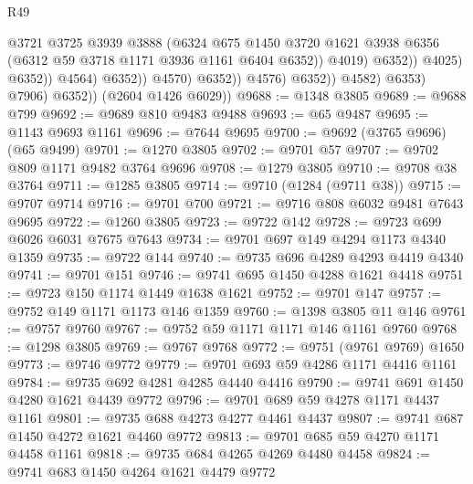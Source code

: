 \begin{lexlean}{R49}
\begin{coremodule}
                                              @3721
                                              @3725
                                              @3939
                                              @3888
                                              (@6324
                                                @675
                                                @1450
                                                @3720
                                                @1621
                                                @3938
                                                @6356
                                                (@6312 @59 @3718 @1171 @3936 @1161 @6404 @6352))
                                              @4019)
                                            @6352))
                                        @4025)
                                      @6352))
                                  @4564)
                                @6352))
                            @4570)
                          @6352))
                      @4576)
                    @6352))
                @4582)
              @6353)
            @7906)
          @6352))
      (@2604 @1426 @6029))
@9688 := @1348 @3805
@9689 := @9688 @799
@9692 := @9689 @810 @9483 @9488
@9693 := @65 @9487
@9695 := @1143 @9693 @1161
@9696 := @7644 @9695
@9700 := @9692 (@3765 @9696) (@65 @9499)
@9701 := @1270 @3805
@9702 := @9701 @57
@9707 := @9702 @809 @1171 @9482 @3764 @9696
@9708 := @1279 @3805
@9710 := @9708 @38 @3764
@9711 := @1285 @3805
@9714 := @9710 (@1284 (@9711 @38))
@9715 := @9707 @9714
@9716 := @9701 @700
@9721 := @9716 @808 @6032 @9481 @7643 @9695
@9722 := @1260 @3805
@9723 := @9722 @142
@9728 := @9723 @699 @6026 @6031 @7675 @7643
@9734 := @9701 @697 @149 @4294 @1173 @4340 @1359
@9735 := @9722 @144
@9740 := @9735 @696 @4289 @4293 @4419 @4340
@9741 := @9701 @151
@9746 := @9741 @695 @1450 @4288 @1621 @4418
@9751 := @9723 @150 @1174 @1449 @1638 @1621
@9752 := @9701 @147
@9757 := @9752 @149 @1171 @1173 @146 @1359
@9760 := @1398 @3805 @11 @146
@9761 := @9757 @9760
@9767 := @9752 @59 @1171 @1171 @146 @1161 @9760
@9768 := @1298 @3805
@9769 := @9767 @9768
@9772 := @9751 (@9761 @9769) @1650
@9773 := @9746 @9772
@9779 := @9701 @693 @59 @4286 @1171 @4416 @1161
@9784 := @9735 @692 @4281 @4285 @4440 @4416
@9790 := @9741 @691 @1450 @4280 @1621 @4439 @9772
@9796 := @9701 @689 @59 @4278 @1171 @4437 @1161
@9801 := @9735 @688 @4273 @4277 @4461 @4437
@9807 := @9741 @687 @1450 @4272 @1621 @4460 @9772
@9813 := @9701 @685 @59 @4270 @1171 @4458 @1161
@9818 := @9735 @684 @4265 @4269 @4480 @4458
@9824 := @9741 @683 @1450 @4264 @1621 @4479 @9772

\end{coremodule}
\end{lexlean}
